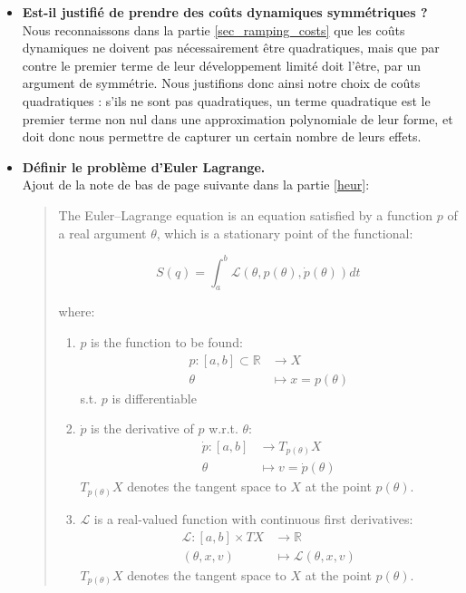 \documentclass{article}
\begin{document}
\begin{itemize}
\item \textbf{Est-il justifié de prendre des coûts dynamiques symmétriques ? }\\

Nous reconnaissons dans la partie \ref{sec_ramping_costs} que les coûts dynamiques ne doivent pas nécessairement être quadratiques, mais que par contre le premier terme de leur développement limité doit l'être, par un argument de symmétrie. Nous justifions donc ainsi notre choix de coûts quadratiques : s'ils ne sont pas quadratiques, un terme quadratique est le premier terme non nul dans une approximation polynomiale de leur forme, et doit donc nous permettre de capturer un certain nombre de leurs effets.

\item \textbf{Définir le problème d'Euler Lagrange.}\\

Ajout de la note de bas de page suivante dans la partie \ref{heur}:

\begin{quote}
The Euler–Lagrange equation is an equation satisfied by a function  $p$ of a real argument $\theta$, which is a stationary point of the functional:

$$ S(q) = \int_a^b \mathcal{L}(\theta,p(\theta),\dot{p}(\theta))dt$$

where:
\begin{enumerate}
\item $p$ is the function to be found:
\begin{align*}
p \colon [a,b] \subset \mathbb{R} &\to X\\
\theta & \mapsto x=p(\theta)
\end{align*}
s.t. $p$ is differentiable
\item $\dot{p}$ is the derivative of $p$ w.r.t. $\theta$:
\begin{align*}
\dot{p} \colon [a,b] &\to T_{p(\theta)}X\\
\theta & \mapsto v=\dot{p}(\theta)
\end{align*}
$T_{p(\theta)}X$ denotes the tangent space to $X$ at the point $p(\theta)$.
\item $\mathcal{L}$ is a real-valued function with continuous first derivatives:
\begin{align*}
\mathcal{L} \colon [a,b] \times TX &\to\mathbb{R}\\
(\theta,x,v) & \mapsto \mathcal{L}(\theta,x,v)
\end{align*}
$T_{p(\theta)}X$ denotes the tangent space to $X$ at the point $p(\theta)$.
\end{enumerate}
\end{quote}


\end{itemize}
\end{document}
